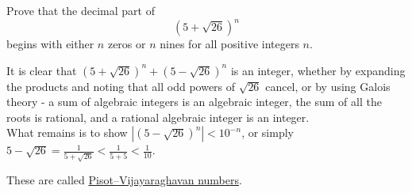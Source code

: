 \begin{problem}
    Prove that the decimal part of
    \[
        {\left(5 + \sqrt{26}\right)}^{n}
    \]
    begins with either \( n \) zeros or \( n \) nines for all positive integers \( n \).
\end{problem}
\begin{solution}
    It is clear that \( {\left(5 + \sqrt{26}\right)}^{n} + {\left(5 - \sqrt{26}\right)}^{n} \) is an integer, whether by expanding the products and noting that all odd powers of \( \sqrt{26} \) cancel, or by using Galois theory - a sum of algebraic integers is an algebraic integer, the sum of all the roots is rational, and a rational algebraic integer is an integer.\\
    What remains is to show \( |{\left(5 - \sqrt{26}\right)}^{n}| < 10^{-n} \), or simply \( 5 - \sqrt{26} = \frac{1}{5 + \sqrt{26}} < \frac{1}{5+5} < \frac{1}{10} \).
    \begin{remark}
        These are called \href{https://en.wikipedia.org/wiki/Pisot%E2%80%93Vijayaraghavan_number}{Pisot–Vijayaraghavan numbers}.
    \end{remark}
\end{solution}
